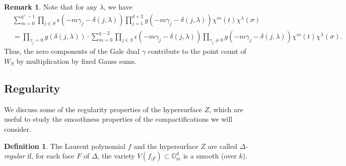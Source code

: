 \documentclass[11pt, reqno]{amsart}
\theoremstyle{plain}
\theoremstyle{definition}
\newtheorem{defi}[theo]{Definition}
\newtheorem{rem}[theo]{Remark}
\newcommand{\ga}{\gamma}
\newcommand{\G}{\mathbb{G}}
\begin{document}
\begin{rem}\label{rem:zero-components}
Note that for any $\lambda$, we have
\begin{align*}
&\sum_{m=0}^{q^\times -1}\prod_{j\in S} \epsilon\left( -m \gamma_j -\delta(j,\lambda) \right)\prod_{j=1}^{d+2}g\left(-m\gamma_j - \delta(j,\lambda)\right) \chi^{m}(t) \chi^{\lambda}(\sigma)\\
&= \prod_{\ga_j =0} g(\delta(j,\lambda))\cdot  \sum_{m=0}^{q-2}\prod_{j\in S} \epsilon\left( -m \gamma_j -\delta(j,\lambda) \right)\prod_{\ga_j \neq 0}g\left(-m\gamma_j - \delta(j,\lambda)\right) \chi^{m}(t) \chi^{\lambda}(\sigma).
\end{align*}
Thus, the zero components of the Gale dual $\ga$ contribute to the point count of $W_S$ by multiplication by fixed Gauss sums. 
\end{rem}

\subsection{Regularity} We discuss some of the regularity properties of the hypersurface $Z$, which are useful to study the smoothness properties of the compactifications we will consider.

\begin{defi}\label{def:Delta}\cite[Definition 2.6]{Denef-Loeser}
 The Laurent polynomial $f$ and the hypersurface $Z$ are called \emph{$\Delta$-regular} if, for each face $F$ of $\Delta$, the variety $V(f_{|F}) \subset\G_m^{d}$ is a smooth (over $k$).  
\end{defi}
\end{document}
